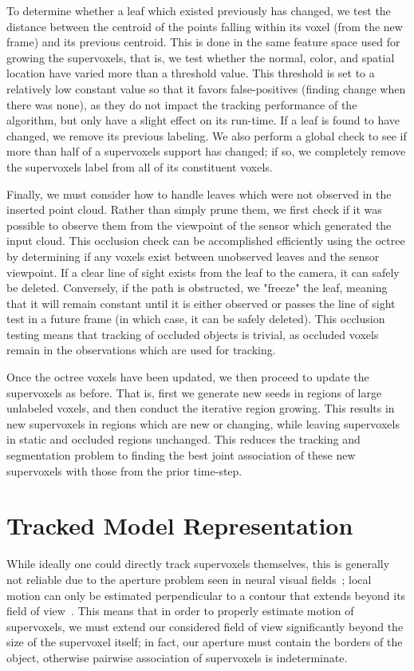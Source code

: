 To determine whether a leaf which existed previously has changed, we test the distance between the centroid of the points falling within its voxel (from the new frame) and its previous centroid. This is done in the same feature space used for growing the supervoxels, that is, we test whether the normal, color, and spatial location have varied more than a threshold value. This threshold is set to a relatively low constant value so that it favors false-positives (finding change when there was none), as they do not impact the tracking performance of the algorithm, but only have a slight effect on its run-time.  If a leaf is found to have changed, we remove its previous labeling. We also perform a global check to see if more than half of a supervoxels support has changed; if so, we completely remove the supervoxels label from all of its constituent voxels. 

Finally, we must consider how to handle leaves which were not observed in the inserted point cloud. Rather than simply prune them, we first check if it was possible to observe them from the viewpoint of the sensor which generated the input cloud. This occlusion check can be accomplished efficiently using the octree by determining if any voxels exist between unobserved leaves and the sensor viewpoint. If a clear line of sight exists from the leaf to the camera, it can safely be deleted. Conversely, if the path is obstructed, we "freeze" the leaf, meaning that it will remain constant until it is either observed or passes the line of sight test in a future frame (in which case, it can be safely deleted). This occlusion testing means that tracking of occluded objects is trivial, as occluded voxels remain in the observations which are used for tracking.

Once the octree voxels have been updated, we then proceed to update the supervoxels as before. That is, first we generate new seeds in regions of large unlabeled voxels, and then conduct the iterative region growing. This results in new supervoxels in regions which are new or changing, while leaving supervoxels in static and occluded regions unchanged. This reduces the tracking and segmentation problem to finding the best joint association of these new supervoxels with those from the prior time-step.

\section{Tracked Model Representation}
While ideally one could directly track supervoxels themselves, this is generally not reliable due to the aperture problem seen in neural visual fields~\cite{MarrApertureProblem}; local motion can only be estimated perpendicular to a contour that extends beyond its field of view~\cite{shimojo1989}. This means that in order to properly estimate motion of supervoxels, we must extend our considered field of view significantly beyond the size of the supervoxel itself; in fact, our aperture must contain the borders of the object, otherwise pairwise association of supervoxels is indeterminate. 

